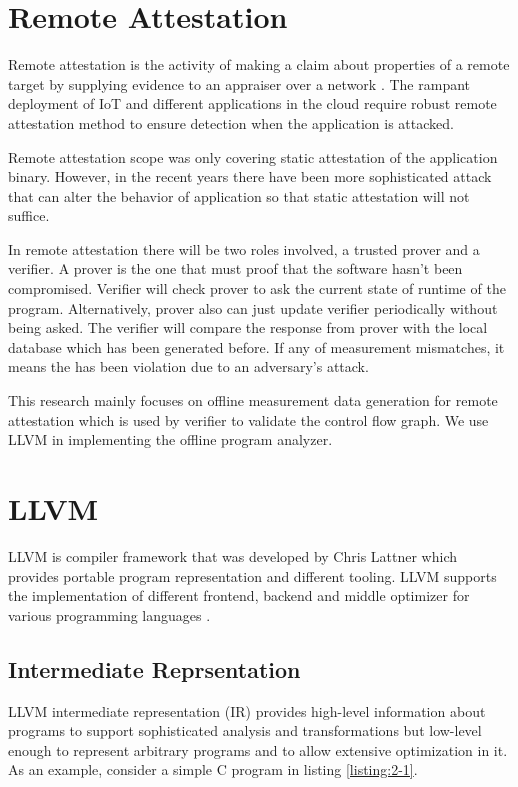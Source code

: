 \section{Remote Attestation}
Remote attestation is the activity of making a claim about properties of a remote target by supplying evidence to an appraiser over a network \cite{cokerPrinciplesRemoteAttestation2011a}. The rampant deployment of IoT and different applications in the cloud require robust remote attestation method to ensure detection when the application is attacked.

Remote attestation scope was only covering static attestation of the application binary. However, in the recent years there have been more sophisticated attack that can alter the behavior of application so that static attestation will not suffice. 

In remote attestation there will be two roles involved, a trusted prover and a verifier. A prover is the one that must proof that the software hasn't been compromised. Verifier will check prover to ask the current state of runtime of the program. Alternatively, prover also can just update verifier periodically without being asked. The verifier will compare the response from prover with the local database which has been generated before. If any of measurement mismatches, it means the has been violation due to an adversary's attack.

This research mainly focuses on offline measurement data generation for remote attestation which is used by verifier to validate the control flow graph. We use LLVM in implementing the offline program analyzer.

\section{LLVM}

LLVM is compiler framework that was developed by Chris Lattner which provides portable program representation and different tooling. LLVM supports the implementation of different frontend, backend and middle optimizer for various programming languages \cite{lattnerLLVMCompilationFramework2004a}. 

\subsection{Intermediate Reprsentation}

LLVM intermediate representation (IR) provides high-level information about programs to support sophisticated analysis and transformations but low-level enough to represent arbitrary programs and to allow extensive optimization in it. As an example, consider a simple C program in listing \ref{listing:2-1}.

